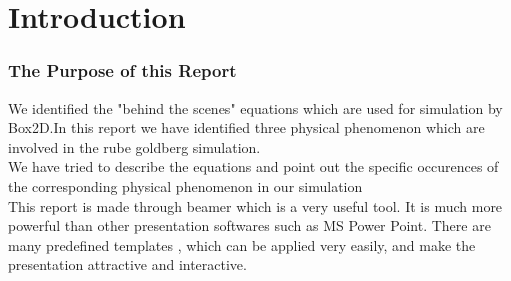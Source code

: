 \section{Introduction}
\begin{frame}
	\frametitle{The Purpose of this Report}
	We identified the "behind the scenes" equations which are used for simulation by Box2D.\pause In this report we have identified three physical phenomenon which are 
	involved in the rube goldberg simulation. \pause \\
	We have tried to describe the equations  and point out the specific occurences of the corresponding physical phenomenon in our simulation\pause \\
	
	This report is made through beamer which is a very useful tool. It is much more powerful than other presentation softwares such as MS Power Point. \pause
	There are many predefined templates , which can be applied very easily, and make the presentation attractive and interactive.\pause
	
	
	
\end{frame}
